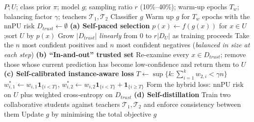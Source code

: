 \documentclass{article}
\begin{document}
\begin{algorithm}[!h]
\renewcommand{\algorithmicrequire}{\textbf{Input:}} %
\renewcommand{\algorithmicensure}{\textbf{Output:}} %
	\caption{Self-PU (self-paced, self-calibrated and self-distilled PU training)} %
	\begin{algorithmic}[1] %
	    \REQUIRE
	    $P;U$; class prior $\pi$; model $g$; sampling ratio $r$ (10\%--40\%);
	    warm-up epochs $T_{w}$; balancing factor $\gamma$; teachers $\mathcal{T}_{1},\mathcal{T}_{2}$
	    \ENSURE
	    Classifier $g$
	    \STATE Warm up $g$ for $T_{w}$ epochs with the nnPU risk %
	    \STATE $D_{trust}\leftarrow \emptyset$
	    \STATE \textbf{(a) Self-paced selection}
	    \STATE \quad $p(x)\leftarrow f(g(x))$ for $x\in U$;\quad sort $U$ by $p(x)$ %
	    \STATE \quad Grow $|D_{trust}|$ \emph{linearly} from $0$ to $r|D_{U}|$ as training proceeds %
	    \STATE \quad Take the $n$ most confident positives and $n$ most confident negatives
	    (\emph{balanced in size at each step}) %
	    \STATE \textbf{(b) ``In-and-out'' trusted set}
	    \STATE \quad Re-examine every $x\in D_{trust}$; remove those whose current prediction
	    has become low-confidence and return them to $U$ %
	    \STATE \textbf{(c) Self-calibrated instance-aware loss}
	    \STATE \quad $T\leftarrow \sup\{k:\sum_{i=1}^{k}w_{2,i}<\gamma n\}$ %
	    \STATE \quad $w_{i,1}^{\ast}\leftarrow w_{i,1}\mathbf{1}_{\{i<T\}}$,\qquad
	    $w_{i,2}^{\ast}\leftarrow w_{i,2}\mathbf{1}_{\{i<T\}}+\mathbf{1}_{\{i\geq T\}}$
	    \STATE \quad Form the hybrid loss: nnPU risk on $U$ plus weighted cross-entropy on $D_{trust}$
	    \STATE \textbf{(d) Self-distillation}
	    \STATE \quad Train two collaborative students against teachers $\mathcal{T}_{1},\mathcal{T}_{2}$
	    and enforce consistency between them %
	    \STATE Update $g$ by minimising the total objective
	    \ENDFOR
		\RETURN $g$
	\end{algorithmic}
\end{algorithm}
\end{document}
